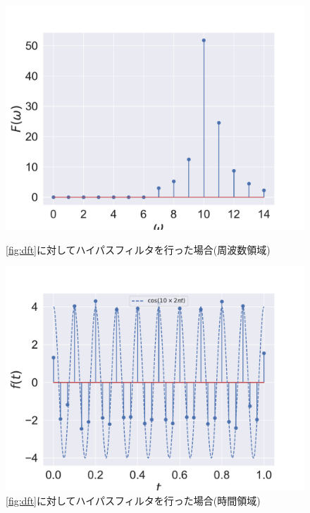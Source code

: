 \iffigure
\begin{figure}[h]
    \centering
  \begin{minipage}{.45\hsize}
    \includegraphics[clip, width=\textwidth]{figure/high_pass_dft.pdf}
    \caption{\autoref{fig:dft}に対してハイパスフィルタを行った場合(周波数領域)}
    \label{fig:high_sin}
  \end{minipage}
  \begin{minipage}{.45\hsize}
    \includegraphics[clip, width=\textwidth]{figure/high_pass_idft.pdf}
    \caption{\autoref{fig:dft}に対してハイパスフィルタを行った場合(時間領域)}
    \label{fig:high_sin}
  \end{minipage}
\end{figure}
\fi


